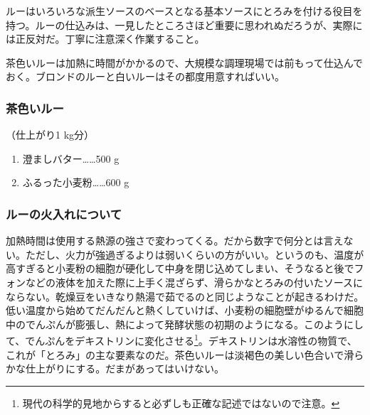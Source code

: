 
 

ルーはいろいろな派生ソースのベースとなる基本ソースにとろみを付ける役目を持つ。ルーの仕込みは、一見したところさほど重要に思われぬだろうが、実際には正反対だ。丁寧に注意深く作業すること。

茶色いルーは加熱に時間がかかるので、大規模な調理現場では前もって仕込んでおく。ブロンドのルーと白いルーはその都度用意すればいい。
\begin{recette}
\hypertarget{roux-brun}{%
\subsubsection{茶色いルー}\label{roux-brun}}


 

（仕上がり1 kg分）

\begin{enumerate}
\def\labelenumi{\arabic{enumi}.}
\tightlist
\item
  澄ましバター\ldots{}\ldots{}500 g
\item
  ふるった小麦粉\ldots{}\ldots{}600 g
\end{enumerate}

\hypertarget{cuisson-des-roux}{%
\subsubsection{ルーの火入れについて}\label{cuisson-des-roux}}


加熱時間は使用する熱源の強さで変わってくる。だから数字で何分とは言えない。ただし、火力が強過ぎるよりは弱いくらいの方がいい。というのも、温度が高すぎると小麦粉の細胞が硬化して中身を閉じ込めてしまい、そうなると後でフォンなどの液体を加えた際に上手く混ざらず、滑らかなとろみの付いたソースにならない。乾燥豆をいきなり熱湯で茹でるのと同じようなことが起きるわけだ。低い温度から始めてだんだんと熱くしていけば、小麦粉の細胞壁がゆるんで細胞中のでんぷんが膨張し、熱によって発酵状態の初期のようになる。このようにして、でんぷんをデキストリンに変化させる\footnote{現代の科学的見地からすると必ずしも正確な記述ではないので注意。}。デキストリンは水溶性の物質で、これが「とろみ」の主な要素なのだ。茶色いルーは淡褐色の美しい色合いで滑らかな仕上がりにする。だまがあってはいけない。


\end{recette}

